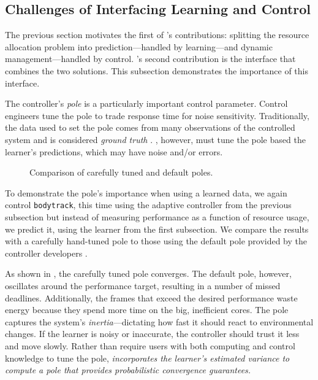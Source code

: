 \subsection{Challenges of Interfacing Learning and Control}
The previous section motivates the first of \SYSTEM{}'s contributions:
splitting the resource allocation problem into prediction---handled by
learning---and dynamic management---handled by control. \SYSTEM{}'s
second contribution is the interface that combines the two solutions.
This subsection demonstrates the importance of this interface.

The controller's \emph{pole} is a particularly important control
parameter.  Control engineers tune the pole to trade response time for
noise sensitivity.  Traditionally, the data used to set the pole comes
from many observations of the controlled system and is considered
\emph{ground truth} \cite{Hellerstein2004a}.  \SYSTEM{}, however, must
tune the pole based the learner's predictions, which may have noise
and/or errors.


\begin{figure} 

\caption{Comparison of carefully tuned and default poles.}
\label{fig:not-simple}
\end{figure}
To demonstrate the pole's importance when using a learned data, we
again control \texttt{bodytrack}, this time using the adaptive
controller from the previous subsection but instead of measuring
performance as a function of resource usage, we predict it, using the
learner from the first subsection.  We compare the results with a
carefully hand-tuned pole to those using the default pole provided by
the controller developers \cite{POET}.

As shown in , the carefully tuned pole
converges. The default pole, however, oscillates around the
performance target, resulting in a number of missed deadlines.
Additionally, the frames that exceed the desired performance waste
energy because they spend more time on the big, inefficient cores. The
pole captures the system's \emph{inertia}---dictating how fast it
should react to environmental changes.  If the learner is noisy or
inaccurate, the controller should trust it less and move slowly.
Rather than require users with both computing and control knowledge to
tune the pole, \emph{\SYSTEM{} incorporates the learner's estimated
  variance to compute a pole that provides probabilistic convergence
  guarantees.}


